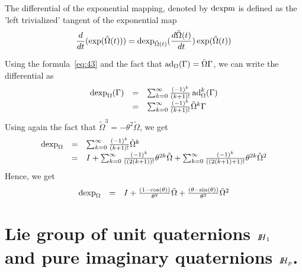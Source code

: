 
The differential of the exponential mapping, denoted by $\operatorname{dexpm}$ is defined as the 'left trivialized' tangent of the exponential map
\begin{equation}
  \label{eq:72}
   \frac{d}{dt} (\exp(\tilde \Omega(t))) = \operatorname{dexp}_{\tilde\Omega(t)}(\frac{d \tilde{\Omega}(t)}{dt}) \exp(\tilde\Omega(t))
\end{equation}

Using the formula~\eqref{eq:43} and the fact that $\operatorname{ad}_\Omega(\Gamma) = \Tilde\Omega \Gamma$, we can write the differential as
\begin{equation}
  \label{eq:122}
  \begin{array}{lcl}
    \operatorname{dexp}_{\Omega}(\Gamma) &=& \sum_{k=0}^\infty \frac{(-1)^k}{(k+1)!} \operatorname{ad}_\Omega^k (\Gamma) \\
                          &=& \sum_{k=0}^\infty \frac{(-1)^k}{(k+1)!} \tilde\Omega^k \Gamma \\
  \end{array}
\end{equation}
Using again the fact that $\tilde\Omega^3 = -\theta^2 \tilde\Omega$, we get
\begin{equation}
  \label{eq:123}
   \begin{array}{lcl}
     \operatorname{dexp}_{\Omega} &=& \sum_{k=0}^\infty  \frac{(-1)^k}{(k+1)!} \tilde\Omega^k \\
                    &=& I  + \sum_{k=0}^\infty  \frac{(-1)^k}{((2(k+1))!} \theta^{2k} \tilde\Omega + \sum_{k=0}^\infty  \frac{(-1)^k}{((2(k+1)+1)!} \theta^{2k} \tilde\Omega^2\\
  \end{array}
\end{equation}
Hence, we get
\begin{equation}
  \label{eq:124}
   \begin{array}{lcl}
     \operatorname{dexp}_{\Omega}  &=& I  + \frac{(1-\cos(\theta))}{\theta^2}\tilde\Omega + \frac{(\theta-\sin(\theta))}{\theta^3}\tilde\Omega^2 
  \end{array}
\end{equation}



\section{Lie group of unit quaternions $\mbox{\rm $I\!\!H$}_1$ and pure imaginary quaternions $\mbox{\rm $I\!\!H$}_p$.}


